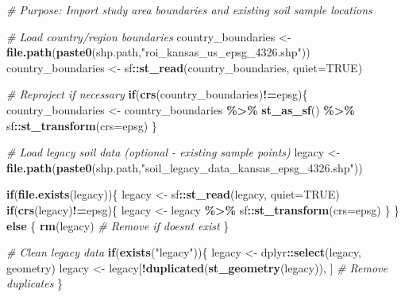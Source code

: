 \documentclass[
  10pt,
  b5paper,
  oneside]{book}
\newenvironment{Shaded}{\begin{snugshade}}{\end{snugshade}}
\newcommand{\AttributeTok}[1]{\textcolor[rgb]{0.13,0.29,0.53}{#1}}
\newcommand{\CommentTok}[1]{\textcolor[rgb]{0.56,0.35,0.01}{\textit{#1}}}
\newcommand{\ConstantTok}[1]{\textcolor[rgb]{0.56,0.35,0.01}{#1}}
\newcommand{\ControlFlowTok}[1]{\textcolor[rgb]{0.13,0.29,0.53}{\textbf{#1}}}
\newcommand{\FunctionTok}[1]{\textcolor[rgb]{0.13,0.29,0.53}{\textbf{#1}}}
\newcommand{\NormalTok}[1]{#1}
\newcommand{\OtherTok}[1]{\textcolor[rgb]{0.56,0.35,0.01}{#1}}
\newcommand{\SpecialCharTok}[1]{\textcolor[rgb]{0.81,0.36,0.00}{\textbf{#1}}}
\newcommand{\StringTok}[1]{\textcolor[rgb]{0.31,0.60,0.02}{#1}}
\begin{document}
\begin{Shaded}
\begin{Highlighting}[]
\CommentTok{\# Purpose: Import study area boundaries and existing soil sample locations}

\CommentTok{\# Load country/region boundaries}
\NormalTok{country\_boundaries }\OtherTok{\textless{}{-}} \FunctionTok{file.path}\NormalTok{(}\FunctionTok{paste0}\NormalTok{(shp.path,}\StringTok{"roi\_kansas\_us\_epsg\_4326.shp"}\NormalTok{))}
\NormalTok{country\_boundaries }\OtherTok{\textless{}{-}}\NormalTok{ sf}\SpecialCharTok{::}\FunctionTok{st\_read}\NormalTok{(country\_boundaries, }\AttributeTok{quiet=}\ConstantTok{TRUE}\NormalTok{)}

\CommentTok{\# Reproject if necessary}
\ControlFlowTok{if}\NormalTok{(}\FunctionTok{crs}\NormalTok{(country\_boundaries)}\SpecialCharTok{!=}\NormalTok{epsg)\{}
\NormalTok{  country\_boundaries }\OtherTok{\textless{}{-}}\NormalTok{ country\_boundaries }\SpecialCharTok{\%\textgreater{}\%}
    \FunctionTok{st\_as\_sf}\NormalTok{() }\SpecialCharTok{\%\textgreater{}\%}\NormalTok{ sf}\SpecialCharTok{::}\FunctionTok{st\_transform}\NormalTok{(}\AttributeTok{crs=}\NormalTok{epsg)}
\NormalTok{\}}

\CommentTok{\# Load legacy soil data (optional {-} existing sample points)}
\NormalTok{legacy }\OtherTok{\textless{}{-}} \FunctionTok{file.path}\NormalTok{(}\FunctionTok{paste0}\NormalTok{(shp.path,}\StringTok{"soil\_legacy\_data\_kansas\_epsg\_4326.shp"}\NormalTok{))}

\ControlFlowTok{if}\NormalTok{(}\FunctionTok{file.exists}\NormalTok{(legacy))\{}
\NormalTok{  legacy }\OtherTok{\textless{}{-}}\NormalTok{ sf}\SpecialCharTok{::}\FunctionTok{st\_read}\NormalTok{(legacy, }\AttributeTok{quiet=}\ConstantTok{TRUE}\NormalTok{)}
  \ControlFlowTok{if}\NormalTok{(}\FunctionTok{crs}\NormalTok{(legacy)}\SpecialCharTok{!=}\NormalTok{epsg)\{}
\NormalTok{    legacy }\OtherTok{\textless{}{-}}\NormalTok{ legacy }\SpecialCharTok{\%\textgreater{}\%}\NormalTok{ sf}\SpecialCharTok{::}\FunctionTok{st\_transform}\NormalTok{(}\AttributeTok{crs=}\NormalTok{epsg)}
\NormalTok{  \}}
\NormalTok{\} }\ControlFlowTok{else}\NormalTok{ \{}
  \FunctionTok{rm}\NormalTok{(legacy)  }\CommentTok{\# Remove if doesn\textquotesingle{}t exist}
\NormalTok{\} }

\CommentTok{\# Clean legacy data}
\ControlFlowTok{if}\NormalTok{(}\FunctionTok{exists}\NormalTok{(}\StringTok{"legacy"}\NormalTok{))\{}
\NormalTok{  legacy }\OtherTok{\textless{}{-}}\NormalTok{ dplyr}\SpecialCharTok{::}\FunctionTok{select}\NormalTok{(legacy, geometry)}
\NormalTok{  legacy }\OtherTok{\textless{}{-}}\NormalTok{ legacy[}\SpecialCharTok{!}\FunctionTok{duplicated}\NormalTok{(}\FunctionTok{st\_geometry}\NormalTok{(legacy)), ]  }\CommentTok{\# Remove duplicates}
\NormalTok{\}}
\end{Highlighting}
\end{Shaded}
\end{document}
